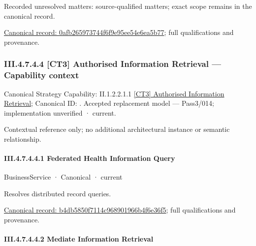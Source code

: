 {\small Recorded unresolved matters: source-qualified matters; exact scope remains in the canonical record.}\par
{\footnotesize \href{../../../../../../../../continuum/business/business-function/0afb265973744f6f9e95ee54e6ea5b77.md}{Canonical record: 0afb265973744f6f9e95ee54e6ea5b77}; full qualifications and provenance.}\par
\subsubsection*{III.4.7.4.4 [CT3] Authorised Information Retrieval — Capability context}
\label{navigation:III.4.7.4.4}

{\small Canonical Strategy Capability: II.1.2.2.1.1 \hyperref[element:2c8a8c2de8a947478e06212a90ff066f]{[CT3] Authorised Information Retrieval}; Canonical ID: \texttt{}. Accepted replacement model — Pass3/014; implementation unverified · current.}\par
Contextual reference only; no additional architectural instance or semantic relationship.\par
\paragraph*{III.4.7.4.4.1 Federated Health Information Query}
\label{navigation:III.4.7.4.4.1}

\label{element:b4db5850f7114c968901966b4f6e36f5}
{\small BusinessService · Canonical · current}\par

Resolves distributed record queries.


{\footnotesize \href{../../../../../../../../continuum/business/business-service/b4db5850f7114c968901966b4f6e36f5.md}{Canonical record: b4db5850f7114c968901966b4f6e36f5}; full qualifications and provenance.}\par
\paragraph*{III.4.7.4.4.2 Mediate Information Retrieval}
\label{navigation:III.4.7.4.4.2}

